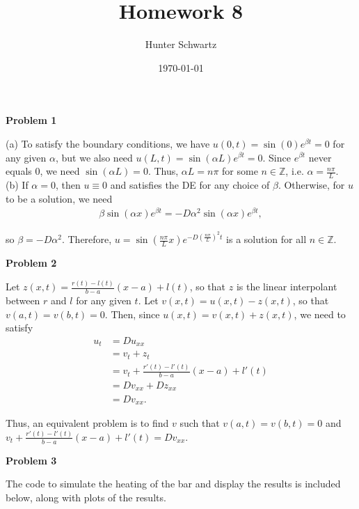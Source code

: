 \documentclass[12pt]{article}
\renewcommand{\a}{\alpha}
\renewcommand{\b}{\beta}
\renewcommand{\int}{\mathbb{Z}}
\begin{document}
\title{Homework 8}
\date{\today}
\author{Hunter Schwartz}
\maketitle


\textbf{Problem 1}

(a) To satisfy the boundary conditions, we have $u(0,t) = \sin(0)e^{\b t} = 0$ for any given $\a$, but we also need $u(L,t) = \sin(\a L) e^{\b t} = 0$. Since $e^{\b t}$ never equals $0$, we need $\sin(\a L) = 0$. Thus, $\a L = n\pi$ for some $n \in \int$, i.e. $\a = \frac{n\pi}{L}$.
\\

(b) If $\a = 0$, then $u \equiv 0$ and satisfies the DE for any choice of $\b$. Otherwise, for $u$ to be a solution, we need
\begin{align*}
\b \sin(\a x) e^{\b t} = - D \a^2 \sin(\a x) e^{\b t},
\end{align*}

so $\b = -D \a^2$. Therefore, $u = \sin(\frac{n\pi}{L} x) e^{-D(\frac{n\pi}{L})^2 t}$ is a solution for all $n \in \int$.

\newpage

\textbf{Problem 2}

Let $z(x,t) = \frac{r(t) - l(t)}{b - a}(x - a) + l(t)$, so that $z$ is the linear interpolant between $r$ and $l$ for any given $t$. Let $v(x,t) = u(x,t) - z(x,t)$, so that $v(a,t) = v(b,t) = 0$. Then, since $u(x,t) = v(x,t) + z(x,t)$, we need to satisfy
\begin{align*}
u_t &= Du_{xx} \\
&= v_t + z_t \\
&= v_t + \frac{r'(t) - l'(t)}{b-a}(x-a) + l'(t) \\
&= Dv_{xx} + Dz_{xx} \\
&= Dv_{xx}.
\end{align*}

Thus, an equivalent problem is to find $v$ such that $v(a,t) = v(b,t) = 0$ and $v_t + \frac{r'(t) - l'(t)}{b-a}(x-a) + l'(t) = Dv_{xx}$.

\newpage

\textbf{Problem 3}

The code to simulate the heating of the bar and display the results is included below, along with plots of the results.
\end{document}
